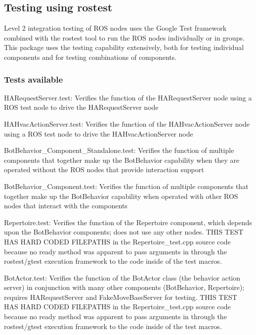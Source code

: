 \subsection*{Testing using rostest}

Level 2 integration testing of R\-O\-S nodes uses the Google Test framework combined with the rostest tool to run the R\-O\-S nodes individually or in groups. This package uses the testing capability extensively, both for testing individual components and for testing combinations of components.

\subsubsection*{Tests available}


\begin{DoxyItemize}
\item H\-A\-Request\-Server.\-test\-: Verifies the function of the H\-A\-Request\-Server node using a R\-O\-S test node to drive the H\-A\-Request\-Server node
\item H\-A\-Hvac\-Action\-Server.\-test\-: Verifies the function of the H\-A\-Hvac\-Action\-Server node using a R\-O\-S test node to drive the H\-A\-Hvac\-Action\-Server node
\item Bot\-Behavior\-\_\-\-Component\-\_\-\-Standalone.\-test\-: Verifies the function of multiple components that together make up the Bot\-Behavior capability when they are operated without the R\-O\-S nodes that provide interaction support
\item Bot\-Behavior\-\_\-\-Component.\-test\-: Verifies the function of multiple components that together make up the Bot\-Behavior capability when operated with other R\-O\-S nodes that interact with the components
\item Repertoire.\-test\-: Verifies the function of the Repertoire component, which depends upon the Bot\-Behavior components; does not use any other nodes. T\-H\-I\-S T\-E\-S\-T H\-A\-S H\-A\-R\-D C\-O\-D\-E\-D F\-I\-L\-E\-P\-A\-T\-H\-S in the Repertoire\-\_\-test.\-cpp source code because no ready method was apparent to pass arguments in through the rostest/gtest execution framework to the code inside of the test macros.
\item Bot\-Actor.\-test\-: Verifies the function of the Bot\-Actor class (the behavior action server) in conjunction with many other components (Bot\-Behavior, Repertoire); requires H\-A\-Request\-Server and Fake\-Move\-Base\-Server for testing. T\-H\-I\-S T\-E\-S\-T H\-A\-S H\-A\-R\-D C\-O\-D\-E\-D F\-I\-L\-E\-P\-A\-T\-H\-S in the Repertoire\-\_\-test.\-cpp source code because no ready method was apparent to pass arguments in through the rostest/gtest execution framework to the code inside of the test macros.
\end{DoxyItemize}

